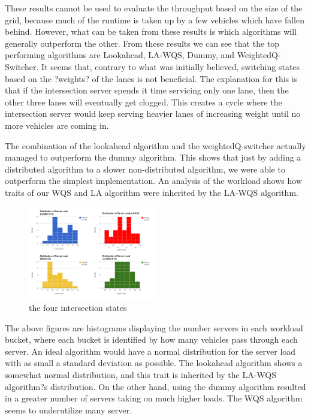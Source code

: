\documentclass[conference]{IEEEtran}
\begin{document}
These results cannot be used to evaluate the throughput based on the size of the grid, because much of the runtime is taken up by a few vehicles which have fallen behind. However, what can be taken from these results is which algorithms will generally outperform the other. From these results we can see that the top performing algorithms are Lookahead, LA-WQS, Dummy, and WeightedQ-Switcher. It seems that, contrary to what was initially believed, switching states based on the ?weights? of the lanes is not beneficial. The explanation for this is that if the intersection server spends it time servicing only one lane, then the other three lanes will eventually get clogged. This creates a cycle where the intersection server would keep serving heavier lanes of increasing weight until no more vehicles are coming in.

The combination of the lookahead algorithm and the weightedQ-switcher actually managed to outperform the dummy algorithm. This shows that just by adding a distributed algorithm to a slower non-distributed algorithm, we were able to outperform the simplest implementation. An analysis of the workload shows how traits of our WQS and LA algorithm were inherited by the LA-WQS algorithm.


\begin{figure}[h]
    \center    
    \includegraphics[width=0.5\textwidth]{images/intersection_load.png}
	\caption{the four intersection states}
	\label{intersection_states}
\end{figure}


The above figures are histograms displaying the number servers in each workload bucket, where each bucket is identified by how many vehicles pass through each server. An ideal algorithm would have a normal distribution for the server load with as small a standard deviation as possible. The lookahead algorithm shows a somewhat normal distribution, and this trait is inherited by the LA-WQS algorithm?s distribution. On the other hand, using the dummy algorithm resulted in a greater number of servers taking on much higher loads. The WQS algorithm seems to underutilize many server.
\end{document}

